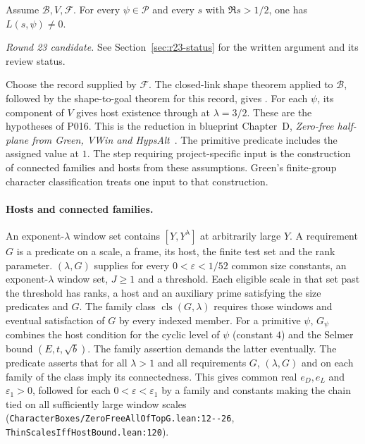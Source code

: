 
\begin{formalstatement}\label{pn:P015}
Assume $\mathcal B,V,\mathcal F$. For every $\psi\in\mathcal P$ and every $s$ with $\Re s>1/2$, one has $L(s,\psi)\ne0$.
\end{formalstatement}
 \noindent\emph{Round 23 candidate.} See Section~\ref{sec:r23-status} for the written argument and its review status.\par
\begin{formalroute}
Choose the record supplied by $\mathcal F$. The closed-link shape theorem applied to $\mathcal B$, followed by the shape-to-goal theorem for this record, gives . For each $\psi$, its component of $V$ gives host existence through  at $\lambda=3/2$. These are the hypotheses of P016. This is the reduction in blueprint Chapter~D, \emph{Zero-free half-plane from Green, VWin and HypsAlt}~. The primitive predicate includes the assigned value at $1$. The step requiring project-specific input is the construction of connected families and hosts from these assumptions. Green's finite-group character classification treats one input to that construction.
\end{formalroute}

\paragraph{Hosts and connected families.} An exponent-$\lambda$ window set contains $[Y,Y^\lambda]$ at arbitrarily large $Y$. A requirement $G$ is a predicate on a scale, a frame, its host, the finite test set and the rank parameter. $(\lambda,G)$ supplies for every $0<\varepsilon<1/52$ common size constants, an exponent-$\lambda$ window set, $J\ge1$ and a threshold. Each eligible scale in that set past the threshold has ranks, a host and an auxiliary prime satisfying the size predicates and $G$. The family class $\operatorname{cls}(G,\lambda)$ requires those windows and eventual satisfaction of $G$ by every indexed member. For a primitive $\psi$, $G_\psi$ combines the host condition  for the cyclic level of $\psi$ (constant $4$) and the Selmer bound $(E,t,\sqrt b)$. The family assertion  demands the latter eventually. The predicate  asserts that for all $\lambda>1$ and all requirements $G$, $(\lambda,G)$ and  on each family of the class imply its connectedness. This gives common real $e_D,e_L$ and $\varepsilon_1>0$, followed for each $0<\varepsilon<\varepsilon_1$ by a family and constants making the chain tied on all sufficiently large window scales (\nolinkurl{CharacterBoxes/ZeroFreeAllOfTopG.lean:12--26}, \nolinkurl{ThinScalesIffHostBound.lean:120}).

